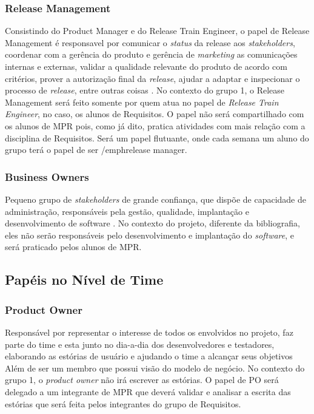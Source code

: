 \subsubsection{Release Management}
Consistindo do Product Manager e do Release Train Engineer, o papel de Release Management é responsavel por comunicar o \emph{status} da release aos \emph{stakeholders}, coordenar com a gerência do produto e gerência de \emph{marketing} as comunicações internas e externas, validar a qualidade relevante do produto de acordo com critérios, prover a autorização final da \emph{release}, ajudar a adaptar e inspecionar o processo de \emph{release}, entre outras coisas \cite{safesite001}.
No contexto do grupo 1, o Release Management será feito somente por quem atua no papel de \emph{Release Train Engineer}, no caso, os alunos de Requisitos. O papel não será compartilhado com os alunos de MPR pois, como já dito, pratica atividades com mais relação com a disciplina de Requisitos. Será um papel flutuante, onde cada semana um aluno do grupo terá o papel de ser /emph{release manager}.

\subsubsection{Business Owners}
Pequeno grupo de \emph{stakeholders} de grande confiança, que dispõe de capacidade de administração, responsáveis pela gestão, qualidade, implantação e desenvolvimento de software \cite{safesite001}. No contexto do projeto, diferente da bibliografia, eles não serão responsáveis pelo desenvolvimento e implantação do \emph{software}, e será praticado pelos alunos de MPR.


\subsection{Papéis no Nível de Time}

\subsubsection{Product Owner}
Responsável por representar o interesse de todos os envolvidos no projeto, faz parte do time e esta junto no dia-a-dia dos desenvolvedores e testadores, elaborando as estórias de usuário e ajudando o time a alcançar seus objetivos \cite[p. 47-48]{safe001} Além de ser um membro que possui visão do modelo de negócio. No contexto do grupo 1, o \emph{product owner} não irá escrever as estórias. O papel de PO será delegado a um integrante de MPR que deverá validar e analisar a escrita das estórias que será feita pelos integrantes do grupo de Requisitos.

